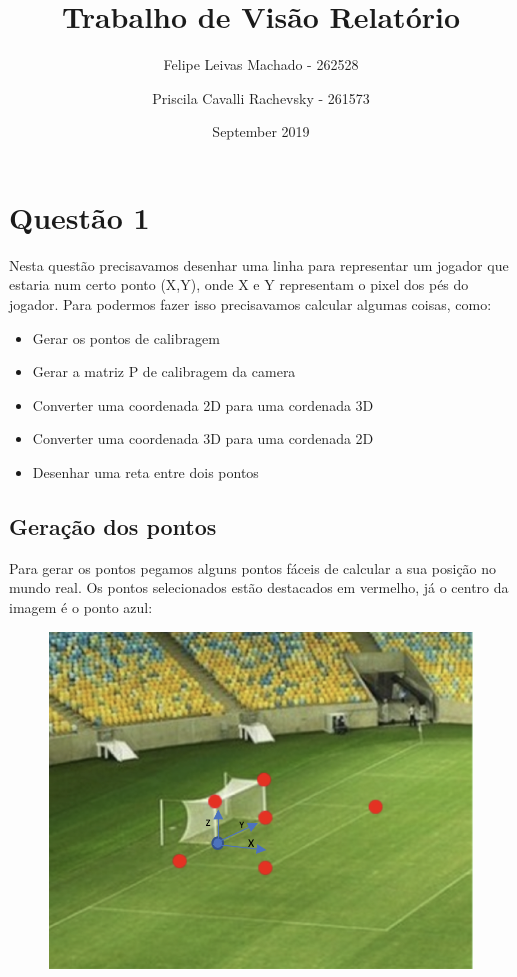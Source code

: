 \documentclass{article}
\title{Trabalho de Visão Relatório}
\author{Felipe Leivas Machado - 262528 \and Priscila Cavalli Rachevsky - 261573 }
\date{September 2019}
\begin{document}
\maketitle

\section{Questão 1}
    Nesta questão precisavamos desenhar uma linha para representar um jogador que estaria num certo ponto (X,Y), onde X e Y representam o pixel dos pés do jogador. Para podermos fazer isso precisavamos calcular algumas coisas, como:
   \begin{itemize}
       \item Gerar os pontos de calibragem
       \item Gerar a matriz P de calibragem da camera
       \item Converter uma coordenada 2D para uma cordenada 3D
       \item Converter uma coordenada 3D  para uma cordenada 2D
       \item Desenhar uma reta entre dois pontos
   \end{itemize}

    \subsection{Geração dos pontos}
        Para gerar os pontos pegamos alguns pontos fáceis de calcular a sua posição no mundo real. Os pontos selecionados estão destacados em vermelho, já o centro da imagem é o ponto azul:

        \begin{figure}[h!]
        \includegraphics[scale=0.5]{maracana1Pontos.png}
        \end{figure}
\end{document}
